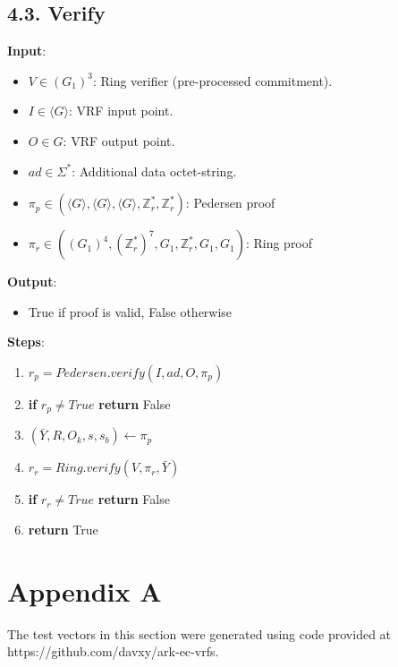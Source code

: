 \documentclass[
]{article}
\providecommand{\tightlist}{%
  \setlength{\itemsep}{0pt}\setlength{\parskip}{0pt}}
\begin{document}
\hypertarget{verify-2}{%
\subsection{4.3. Verify}\label{verify-2}}

\textbf{Input}:

\begin{itemize}
\tightlist
\item
  \(V \in (G_1)^3\): Ring verifier (pre-processed commitment).
\item
  \(I \in \langle G \rangle\): VRF input point.
\item
  \(O \in G\): VRF output point.
\item
  \(ad \in \Sigma^*\): Additional data octet-string.
\item
  \(\pi_p \in (\langle G \rangle, \langle G \rangle, \langle G \rangle, \mathbb{Z}^*_r, \mathbb{Z}^*_r)\):
  Pedersen proof
\item
  \(\pi_r \in ((G_1)^4, (\mathbb{Z}^*_r)^7, G_1, \mathbb{Z}^*_r, G_1, G_1)\):
  Ring proof
\end{itemize}

\textbf{Output}:

\begin{itemize}
\tightlist
\item
  True if proof is valid, False otherwise
\end{itemize}

\textbf{Steps}:

\begin{enumerate}
\def\labelenumi{\arabic{enumi}.}
\tightlist
\item
  \(r_p = Pedersen.verify(I, ad, O, \pi_p)\)
\item
  \textbf{if} \(r_p \neq True\) \textbf{return} False
\item
  \((\bar{Y}, R, O_k, s, s_b) \leftarrow \pi_p\)
\item
  \(r_r = Ring.verify(V, \pi_r, \bar{Y})\)
\item
  \textbf{if} \(r_r \neq True\) \textbf{return} False
\item
  \textbf{return} True
\end{enumerate}

\hypertarget{appendix-a}{%
\section{Appendix A}\label{appendix-a}}

The test vectors in this section were generated using code provided at
https://github.com/davxy/ark-ec-vrfs.
\end{document}
